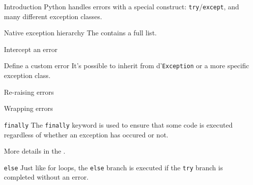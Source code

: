 \begin{frame}{Introduction}
  Python handles errors with a special construct: \texttt{try}/\texttt{except}, and many different exception classes.
\end{frame}

\begin{frame}{Native exception hierarchy}
  The  contains a full list.
\end{frame}

\begin{frame}{Intercept an error}
\end{frame}

\begin{frame}{Define a custom error}
  It's possible to inherit from d'\texttt{Exception} or a more specific exception class.
\end{frame}

\begin{frame}{Re-raising errors}
\end{frame}

\begin{frame}{Wrapping errors}
\end{frame}

\begin{frame}{\texttt{finally}}
  The \texttt{finally} keyword is used to ensure that some code is executed regardless of whether an exception has occured or not.

  More details in the .

\end{frame}

\begin{frame}{\texttt{else}}
  Just like for loops, the \texttt{else} branch is executed if the \texttt{try} branch is completed without an error.
\end{frame}
